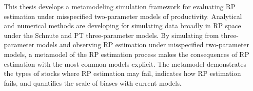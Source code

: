 \documentclass[12pt]{ucscthesis}
\begin{document}
%
This thesis develops a metamodeling simulation framework for evaluating RP 
estimation under misspecified two-parameter models of productivity. Analytical 
and numerical methods are developing for simulating data broadly in RP space 
under the Schnute and PT three-parameter models. 
By simulating from three-parameter models and observing RP estimation under misspecified two-parameter  
models, a metamodel of the RP estimation process makes the consequences of RP estimation with the most 
common models explicit. The metamodel demonstrates the types of stocks where RP estimation may fail, 
indicates how RP estimation fails, and quantifies the scale of biases with current models. 
\end{document}
